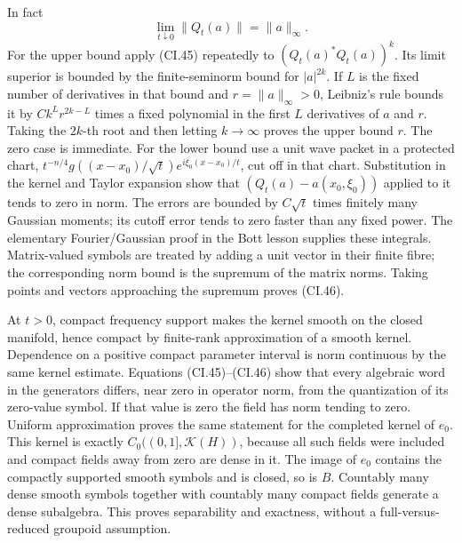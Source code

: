 \documentclass[
  11pt,
]{article}
\begin{document}
In fact \[
 \lim_{t\downarrow0}\|Q_t(a)\|=\|a\|_\infty.
 \tag{CI.46}
\] For the upper bound apply (CI.45) repeatedly to
\((Q_t(a)^*Q_t(a))^k\). Its limit superior is bounded by the
finite-seminorm bound for \(|a|^{2k}\). If \(L\) is the fixed number of
derivatives in that bound and \(r=\|a\|_\infty>0\), Leibniz's rule
bounds it by \(C k^L r^{2k-L}\) times a fixed polynomial in the first
\(L\) derivatives of \(a\) and \(r\). Taking the \(2k\)-th root and then
letting \(k\to\infty\) proves the upper bound \(r\). The zero case is
immediate. For the lower bound use a unit wave packet in a protected
chart, \(t^{-n/4}g((x-x_0)/\sqrt t)e^{i\xi_0(x-x_0)/t}\), cut off in
that chart. Substitution in the kernel and Taylor expansion show that
\((Q_t(a)-a(x_0,\xi_0))\) applied to it tends to zero in norm. The
errors are bounded by \(C\sqrt t\) times finitely many Gaussian moments;
its cutoff error tends to zero faster than any fixed power. The
elementary Fourier/Gaussian proof in the Bott lesson supplies these
integrals. Matrix-valued symbols are treated by adding a unit vector in
their finite fibre; the corresponding norm bound is the supremum of the
matrix norms. Taking points and vectors approaching the supremum proves
(CI.46).

At \(t>0\), compact frequency support makes the kernel smooth on the
closed manifold, hence compact by finite-rank approximation of a smooth
kernel. Dependence on a positive compact parameter interval is norm
continuous by the same kernel estimate. Equations (CI.45)--(CI.46) show
that every algebraic word in the generators differs, near zero in
operator norm, from the quantization of its zero-value symbol. If that
value is zero the field has norm tending to zero. Uniform approximation
proves the same statement for the completed kernel of \(e_0\). This
kernel is exactly \(C_0((0,1],\mathcal K(H))\), because all such fields
were included and compact fields away from zero are dense in it. The
image of \(e_0\) contains the compactly supported smooth symbols and is
closed, so is \(B\). Countably many dense smooth symbols together with
countably many compact fields generate a dense subalgebra. This proves
separability and exactness, without a full-versus-reduced groupoid
assumption.
\end{document}
